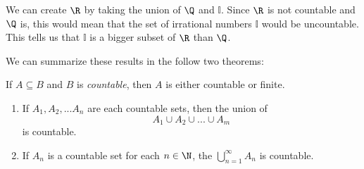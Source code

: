 We can create \( \R \) by taking the union of \( \Q \) and \( \mathbb{I} \). Since \( \R \) is not countable and \( \Q \) is, this would mean that the set of irrational numbers \( \mathbb{I}\) would be uncountable. This tells us that \( \mathbb{I}\) is a bigger subset of \( \R \) than \( \Q \). 

We can summarize these results in the follow two theorems: 


\begin{tcolorbox}
\begin{thm}
    If \( A \subseteq B \) and \( B \) is \textit{countable}, then \( A \) is either countable or finite. 
\end{thm}
\end{tcolorbox}

\begin{tcolorbox}
\begin{thm}
\begin{enumerate}
    \item If \( A_1, A_2,... A_n\) are each countable sets, then the union of 
        \[ A_1 \cup A_2 \cup ... \cup A_m \] is countable.
    \item If \( A_n \) is a countable set for each \( n \in \N \), the \( \bigcup_{n=1}^{\infty}A_n \) is countable. 
\end{enumerate}
\end{thm}
\end{tcolorbox}









